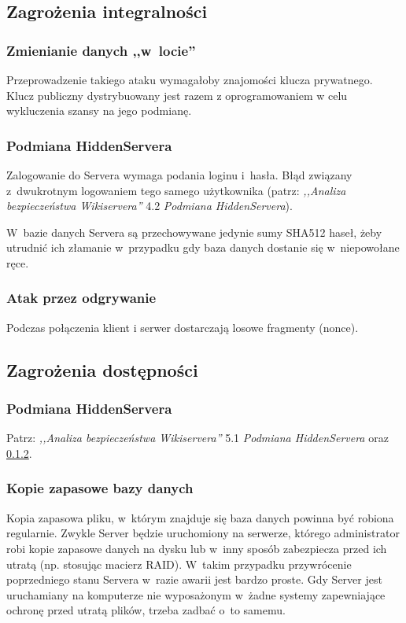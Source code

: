 \documentclass[a4paper,notitlepage]{article}
\begin{document}
\subsection{Zagrożenia integralności}
\subsubsection{Zmienianie danych ,,w~locie''}
Przeprowadzenie takiego ataku wymagałoby znajomości klucza prywatnego. Klucz publiczny dystrybuowany jest razem z oprogramowaniem w celu wykluczenia szansy na jego podmianę.
\subsubsection{Podmiana HiddenServera}
\label{podmianaHS}
Zalogowanie do Servera wymaga podania loginu i~hasła. Błąd związany
z~dwukrotnym logowaniem tego samego użytkownika (patrz: \emph{,,Analiza
bezpieczeństwa Wikiservera''} 4.2 \emph{Podmiana HiddenServera}). 

W~bazie danych Servera są przechowywane jedynie sumy SHA512 haseł,
żeby utrudnić ich złamanie w~przypadku gdy baza danych dostanie
się w~niepowołane ręce.
\subsubsection{Atak przez odgrywanie}
Podczas połączenia klient i serwer dostarczają losowe fragmenty (nonce).
\subsection{Zagrożenia dostępności}
\subsubsection{Podmiana HiddenServera}
Patrz: \emph{,,Analiza
bezpieczeństwa Wikiservera''} 5.1 \emph{Podmiana HiddenServera} oraz 
\ref{podmianaHS}.
\subsubsection{Kopie zapasowe bazy danych}
Kopia zapasowa pliku, w~którym znajduje się baza danych powinna być
robiona regularnie. Zwykle Server będzie uruchomiony na serwerze, którego
administrator robi kopie zapasowe danych na dysku lub w~inny sposób
zabezpiecza przed ich utratą (np. stosując macierz RAID). W~takim przypadku
przywrócenie poprzedniego stanu Servera w~razie awarii jest bardzo proste.
Gdy Server jest uruchamiany na komputerze nie wyposażonym w~żadne systemy
zapewniające ochronę przed utratą plików, trzeba zadbać o~to samemu.
\end{document}
